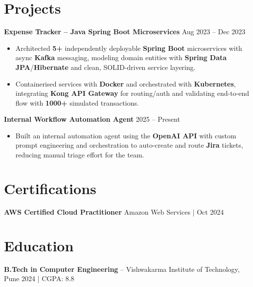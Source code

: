 \documentclass[a4paper,10pt]{article}
\begin{document}
\section*{Projects}

\textbf{Expense Tracker -- Java Spring Boot Microservices} \hfill Aug 2023 -- Dec 2023
\begin{itemize}[leftmargin=*]
    \item Architected \textbf{5+} independently deployable \textbf{Spring Boot} microservices with async \textbf{Kafka} messaging, modeling domain entities with \textbf{Spring Data JPA}/\textbf{Hibernate} and clean, SOLID-driven service layering.
    \item Containerised services with \textbf{Docker} and orchestrated with \textbf{Kubernetes}, integrating \textbf{Kong API Gateway} for routing/auth and validating end-to-end flow with \textbf{1000+} simulated transactions.
\end{itemize}

\textbf{Internal Workflow Automation Agent} \hfill 2025 -- Present
\begin{itemize}[leftmargin=*]
    \item Built an internal automation agent using the \textbf{OpenAI API} with custom prompt engineering and orchestration to auto-create and route \textbf{Jira} tickets, reducing manual triage effort for the team.
\end{itemize}

\section*{Certifications}
\textbf{AWS Certified Cloud Practitioner} \hfill Amazon Web Services \;|\; Oct 2024

\section*{Education}
\textbf{B.Tech in Computer Engineering} -- Vishwakarma Institute of Technology, Pune \hfill 2024 \;|\; CGPA: 8.8
\end{document}
